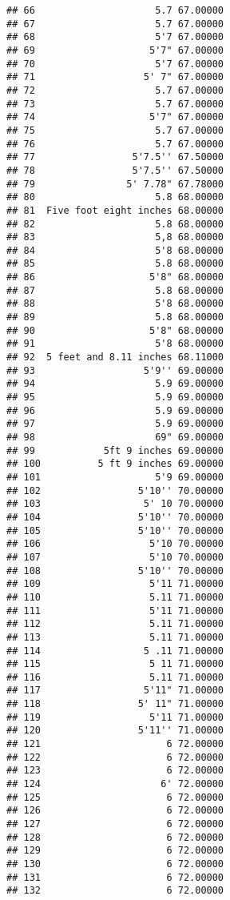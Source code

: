 \documentclass[
]{article}
\begin{document}
\begin{verbatim}
## 66                     5.7 67.00000
## 67                     5.7 67.00000
## 68                     5'7 67.00000
## 69                    5'7" 67.00000
## 70                     5'7 67.00000
## 71                   5' 7" 67.00000
## 72                     5.7 67.00000
## 73                     5.7 67.00000
## 74                    5'7" 67.00000
## 75                     5.7 67.00000
## 76                     5.7 67.00000
## 77                 5'7.5'' 67.50000
## 78                 5'7.5'' 67.50000
## 79                5' 7.78" 67.78000
## 80                     5.8 68.00000
## 81  Five foot eight inches 68.00000
## 82                     5.8 68.00000
## 83                     5,8 68.00000
## 84                     5'8 68.00000
## 85                     5.8 68.00000
## 86                    5'8" 68.00000
## 87                     5.8 68.00000
## 88                     5'8 68.00000
## 89                     5.8 68.00000
## 90                    5'8" 68.00000
## 91                     5'8 68.00000
## 92  5 feet and 8.11 inches 68.11000
## 93                   5'9'' 69.00000
## 94                     5.9 69.00000
## 95                     5.9 69.00000
## 96                     5.9 69.00000
## 97                     5.9 69.00000
## 98                     69" 69.00000
## 99            5ft 9 inches 69.00000
## 100          5 ft 9 inches 69.00000
## 101                    5'9 69.00000
## 102                 5'10'' 70.00000
## 103                  5' 10 70.00000
## 104                 5'10'' 70.00000
## 105                 5'10'' 70.00000
## 106                   5'10 70.00000
## 107                   5'10 70.00000
## 108                 5'10'' 70.00000
## 109                   5'11 71.00000
## 110                   5.11 71.00000
## 111                   5'11 71.00000
## 112                   5.11 71.00000
## 113                   5.11 71.00000
## 114                  5 .11 71.00000
## 115                   5 11 71.00000
## 116                   5.11 71.00000
## 117                  5'11" 71.00000
## 118                 5' 11" 71.00000
## 119                   5'11 71.00000
## 120                 5'11'' 71.00000
## 121                      6 72.00000
## 122                      6 72.00000
## 123                      6 72.00000
## 124                     6' 72.00000
## 125                      6 72.00000
## 126                      6 72.00000
## 127                      6 72.00000
## 128                      6 72.00000
## 129                      6 72.00000
## 130                      6 72.00000
## 131                      6 72.00000
## 132                      6 72.00000

\end{verbatim}
\end{document}
